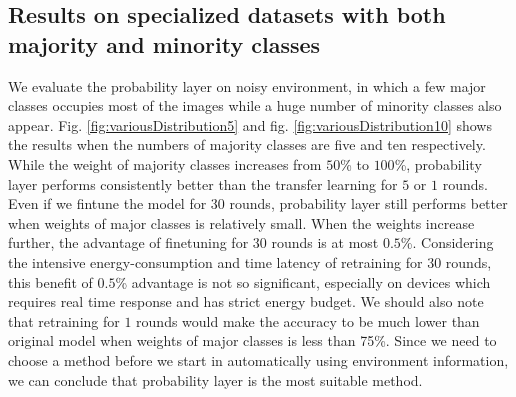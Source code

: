 \documentclass{article}
\begin{document}
\subsection{Results on specialized datasets with both majority and minority classes}

We evaluate the probability layer on noisy environment, in which a few major classes occupies most of the images while a huge number of minority classes also appear. Fig. \ref{fig:variousDistribution5} and fig. \ref{fig:variousDistribution10} shows the results when the numbers of majority classes are five and ten respectively. While the weight of majority classes increases from $50$\% to $100$\%, probability layer performs consistently better than the transfer learning for $5$ or $1$ rounds. Even if we fintune the model for $30$ rounds, probability layer still performs better when weights of major classes is relatively small. When the weights increase further, the advantage of finetuning for $30$ rounds is at most $0.5$\%. Considering the intensive energy-consumption and time latency of retraining for $30$ rounds, this benefit of $0.5$\% advantage is not so significant, especially on devices which requires real time response and has strict energy budget. We should also note that retraining for $1$ rounds would make the accuracy to be much lower than original model when weights of major classes is less than 75\%. Since we need to choose a method before we start in automatically using environment information, we can conclude that probability layer is the most suitable method.
\end{document}
